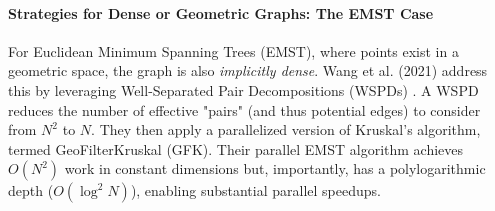 \begin{multicols}{2}
\paragraph{Strategies for Dense or Geometric Graphs: The EMST Case}
For Euclidean Minimum Spanning Trees (EMST), where points exist in a geometric space, the graph is also \textit{implicitly dense}. Wang et al. (2021) address this by leveraging Well-Separated Pair Decompositions (WSPDs) \cite{Wang_Fast_Parallel_EMST_HDBSCAN_2021}. A WSPD reduces the number of effective "pairs" (and thus potential edges) to consider from $N^2$ to $N$. They then apply a parallelized version of Kruskal's algorithm, termed GeoFilterKruskal (GFK). Their parallel EMST algorithm achieves $O(N^2)$ work in constant dimensions but, importantly, has a polylogarithmic depth ($O(\log^2 N)$), enabling substantial parallel speedups. 



\end{multicols}
